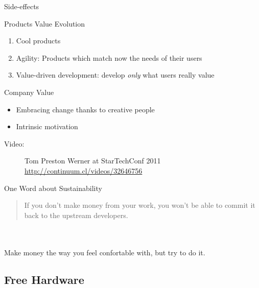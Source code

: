   \begin{frame}{Side-effects}
    \begin{block}{Products Value Evolution}
      \begin{enumerate}
        \item Cool products
        \item Agility: Products which match \alert{now} the needs of their users
        \item Value-driven development: develop \emph{only} what users really value
      \end{enumerate}
    \end{block}
    \begin{block}{Company Value}
      \begin{itemize}
        \item Embracing change thanks to creative people
        \item Intrinsic motivation \cite{pink2011drive}
      \end{itemize}
    \end{block}
    \begin{description}
      \item[Video:] Tom Preston Werner at StarTechConf 2011 \url{http://continuum.cl/videos/32646756}
    \end{description}
  \end{frame}

  \begin{frame}{One Word about Sustainability}
      \hspace{.9em}\vspace{-1.4em}
      \begin{quote}
        If you don't make money from your work, you won't be able to commit it back to the upstream developers.\hspace{.5em}
      \end{quote}\\~\\ \vfill
      Make money the way you feel confortable with, but try to do it.
  \end{frame}

%
\subsection{Free Hardware}

